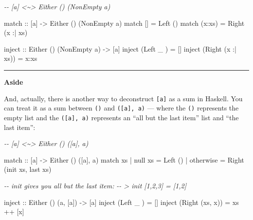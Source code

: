\documentclass[]{article}
\newenvironment{Shaded}{}{}
\newcommand{\CommentTok}[1]{\textcolor[rgb]{0.38,0.63,0.69}{\textit{#1}}}
\newcommand{\DataTypeTok}[1]{\textcolor[rgb]{0.56,0.13,0.00}{#1}}
\newcommand{\FunctionTok}[1]{\textcolor[rgb]{0.02,0.16,0.49}{#1}}
\newcommand{\NormalTok}[1]{#1}
\newcommand{\OperatorTok}[1]{\textcolor[rgb]{0.40,0.40,0.40}{#1}}
\newcommand{\OtherTok}[1]{\textcolor[rgb]{0.00,0.44,0.13}{#1}}
\begin{document}
\begin{Shaded}
\begin{Highlighting}[]
\CommentTok{{-}{-} [a] \textless{}\textasciitilde{}\textgreater{} Either () (NonEmpty a)}

\OtherTok{match ::}\NormalTok{ [a] }\OtherTok{{-}\textgreater{}} \DataTypeTok{Either}\NormalTok{ () (}\DataTypeTok{NonEmpty}\NormalTok{ a)}
\NormalTok{match []     }\OtherTok{=} \DataTypeTok{Left}\NormalTok{  ()}
\NormalTok{match (x}\OperatorTok{:}\NormalTok{xs) }\OtherTok{=} \DataTypeTok{Right}\NormalTok{ (x }\OperatorTok{:|}\NormalTok{ xs)}

\OtherTok{inject ::} \DataTypeTok{Either}\NormalTok{ () (}\DataTypeTok{NonEmpty}\NormalTok{ a) }\OtherTok{{-}\textgreater{}}\NormalTok{ [a]}
\NormalTok{inject (}\DataTypeTok{Left}\NormalTok{   \_       ) }\OtherTok{=}\NormalTok{ []}
\NormalTok{inject (}\DataTypeTok{Right}\NormalTok{ (x }\OperatorTok{:|}\NormalTok{ xs)) }\OtherTok{=}\NormalTok{ x}\OperatorTok{:}\NormalTok{xs}
\end{Highlighting}
\end{Shaded}

\begin{center}\rule{0.5\linewidth}{0.5pt}\end{center}

\textbf{Aside}

And, actually, there is another way to deconstruct \texttt{{[}a{]}} as a sum in
Haskell. You can treat it as a sum between \texttt{()} and
\texttt{({[}a{]},\ a)} --- where the \texttt{()} represents the empty list and
the \texttt{({[}a{]},\ a)} represents an ``all but the last item'' list and
``the last item'':

\begin{Shaded}
\begin{Highlighting}[]
\CommentTok{{-}{-} [a] \textless{}\textasciitilde{}\textgreater{} Either () ([a], a)}

\OtherTok{match  ::}\NormalTok{ [a] }\OtherTok{{-}\textgreater{}} \DataTypeTok{Either}\NormalTok{ () ([a], a)}
\NormalTok{match xs}
  \OperatorTok{|} \FunctionTok{null}\NormalTok{ xs   }\OtherTok{=} \DataTypeTok{Left}\NormalTok{  ()}
  \OperatorTok{|} \FunctionTok{otherwise} \OtherTok{=} \DataTypeTok{Right}\NormalTok{ (}\FunctionTok{init}\NormalTok{ xs, }\FunctionTok{last}\NormalTok{ xs)}

\CommentTok{{-}{-} init gives you all but the last item:}
\CommentTok{{-}{-} \textgreater{} init [1,2,3] = [1,2]}

\OtherTok{inject ::} \DataTypeTok{Either}\NormalTok{ () (a, [a]) }\OtherTok{{-}\textgreater{}}\NormalTok{ [a]}
\NormalTok{inject (}\DataTypeTok{Left}\NormalTok{   \_     ) }\OtherTok{=}\NormalTok{ []}
\NormalTok{inject (}\DataTypeTok{Right}\NormalTok{ (xs, x)) }\OtherTok{=}\NormalTok{ xs }\OperatorTok{++}\NormalTok{ [x]}
\end{Highlighting}
\end{Shaded}
\end{document}

